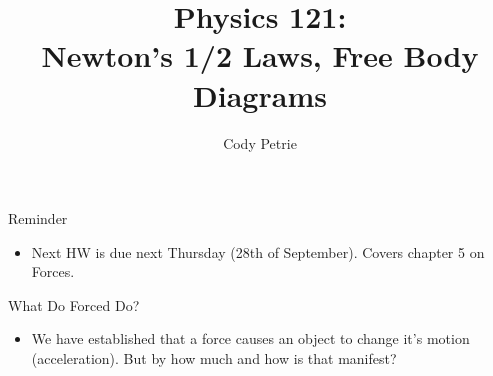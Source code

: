 \documentclass{beamer}
\title[{\color{white}{Chapters 5.4-7}}]{Physics 121: \\ Newton's 1/2 Laws, Free Body Diagrams}
\author{Cody Petrie}
\institute{Mesa Community College}
\date{}
\begin{document}
\begin{frame}
\titlepage
\end{frame}



\begin{frame}{Reminder}
\begin{itemize}
   \item Next HW is due next Thursday (28th of September). Covers chapter 5 on Forces.
\end{itemize}
\end{frame}

\begin{frame}{What Do Forced Do?}
\begin{itemize}
   \item We have established that a force causes an object to change it's motion (acceleration). But by how much and how is that manifest?\\
\end{itemize}
\begin{center}
\end{center}
\end{frame}
\end{document}
